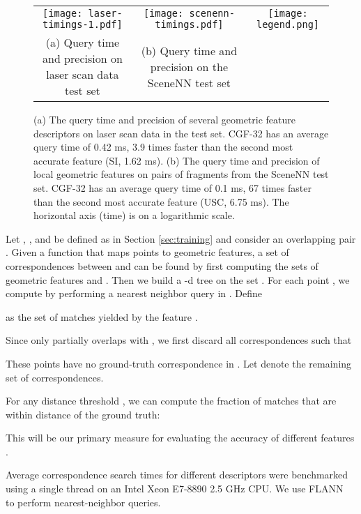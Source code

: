 \begin{figure*}[!t]
\centering
\begin{minipage}{0.97\textwidth}
\centering
\begin{tabular}{c c c}
     \texttt{[image: laser-timings-1.pdf]} &
     \texttt{[image: scenenn-timings.pdf]} &
     \texttt{[image: legend.png]}\\
    \small{(a) Query time and precision on laser scan data test set} & \small{(b) Query time and precision on the SceneNN test set} & \\
\end{tabular}
\end{minipage}\hfill
\vspace{1mm}
\caption{(a) The query time and precision of several geometric feature descriptors on laser scan data in the test set. CGF-32 has an average query time of 0.42 ms, 3.9 times faster than the second most accurate feature (SI, 1.62 ms). (b) The query time and precision of local geometric features on pairs of fragments from the SceneNN test set. CGF-32 has an average query time of 0.1 ms, 67 times faster than the second most accurate feature (USC, 6.75 ms). The horizontal axis (time) is on a logarithmic scale.}
\label{fig:timings}
\vspace{-1mm}
\end{figure*}


Let , , and  be defined as in Section \ref{sec:training} and consider an overlapping pair . Given a function  that maps points to geometric features, a set of correspondences between  and  can be found by first computing the sets of geometric features  and . Then we build a -d tree  on the set . For each point , we compute  by performing a nearest neighbor query in . Define

as the set of matches yielded by the feature .

Since  only partially overlaps with , we first discard all correspondences  such that

These points have no ground-truth correspondence in . Let  denote the remaining set of correspondences.

For any distance threshold , we can compute the fraction of matches that are within distance  of the ground truth:

This will be our primary measure for evaluating the accuracy of different features .

Average correspondence search times for different descriptors were benchmarked using a single thread on an Intel Xeon E7-8890 2.5 GHz CPU. We use FLANN~\cite{flann2014} to perform nearest-neighbor queries.




